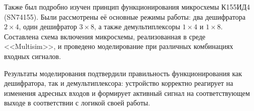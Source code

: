 Также был подробно изучен принцип функционирования микросхемы К155ИД4 (SN74155).  
Были рассмотрены её основные режимы работы: два дешифратора $2 \times 4$, один дешифратор $3 \times 8$, а также демультиплексоры $1 \times 4$ и $1 \times 8$.  
Составлена схема включения микросхемы, реализованная в среде <<Multisim>>, и проведено моделирование при различных комбинациях входных сигналов.

Результаты моделирования подтвердили правильность функционирования как дешифратора, так и демультиплексора: устройство корректно реагирует на изменения адресных входов и формирует активный сигнал на соответствующем выходе в соответствии с логикой своей работы.
